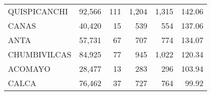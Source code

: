\begin{tabular}{lrrrrr}
	\cellcolor[HTML]{FFFFC7}QUISPICANCHI                                               & 92,566                                                         & 111                                                      & 1,204                                                    & 1,315                                                               & 142.06                                                                       \\
	\cellcolor[HTML]{FFFFC7}CANAS                                                      & 40,420                                                         & 15                                                       & 539                                                      & 554                                                                 & 137.06                                                                       \\
	\cellcolor[HTML]{FFFFC7}ANTA                                                       & 57,731                                                         & 67                                                       & 707                                                      & 774                                                                 & 134.07                                                                       \\
	\cellcolor[HTML]{9AFF99}CHUMBIVILCAS                                               & 84,925                                                         & 77                                                       & 945                                                      & 1,022                                                               & 120.34                                                                       \\
	\cellcolor[HTML]{9AFF99}ACOMAYO                                                    & 28,477                                                         & 13                                                       & 283                                                      & 296                                                                 & 103.94                                                                       \\
	\cellcolor[HTML]{9AFF99}CALCA                                                      & 76,462                                                         & 37                                                       & 727                                                      & 764                                                                 & 99.92                                                                        \\

\end{tabular}
